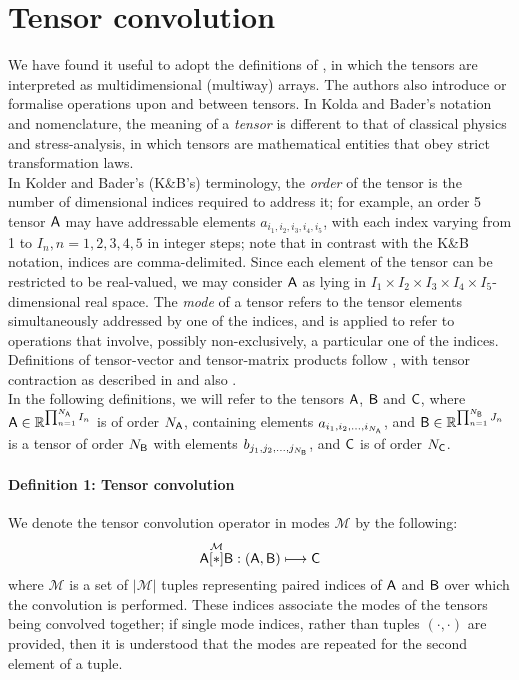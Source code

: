 \section{Tensor convolution}
\label{sec:AppTensorConv}
We have found it useful to adopt the definitions of \citep{kolda2009tensor}, in which the tensors are interpreted as multidimensional (multiway) arrays. The authors also introduce or formalise  operations upon and between tensors.  In Kolda and Bader's notation and nomenclature, the meaning of a {\em tensor} is different to that of classical physics and stress-analysis, in which tensors are mathematical entities that obey strict transformation laws.\\

In Kolder and Bader's (K\&B's) terminology, the {\it order} of the tensor is the number of dimensional indices required to address it; for example, an order 5 tensor $\mathsf{A}$ may have addressable elements $a_{i_1,i_2,i_3,i_4,i_5}$, with each index varying from 1 to $I_n, n = 1,2,3,4,5$ in integer steps; note that in contrast with the K\&B notation, indices are comma-delimited.  Since each element of the tensor can be restricted to be real-valued, we may consider $\mathsf{A}$ as lying in $I_1\times I_2\times I_3 \times I_4 \times I_5$- dimensional real space. The {\it mode} of a tensor refers to the tensor elements simultaneously addressed by one of the indices, and is applied to refer to operations that involve, possibly non-exclusively, a particular one of the indices.  Definitions of tensor-vector and tensor-matrix products follow \cite{kolda2009tensor}, with tensor contraction as described in \citep{bader2006algorithm} and also \citep{aja2009tensors}.\\

In the following definitions, we will refer to the tensors $\mathsf{A}$, $\mathsf{B}$ and $\mathsf{C}$, where $\mathsf{A}\in\mathbb{R}^{\prod_{n=1}^{N_{\mathsf{A}}}I_n}$ is of order $N_{\mathsf{A}}$, containing elements $a_{i_1,i_2,...,i_{N_{\mathsf{A}}}}$, and $\mathsf{B}\in\mathbb{R}^{\prod_{n=1}^{N_{\mathsf{B}}}J_n}$ is a tensor of order $N_{\mathsf{B}}$ with elements $b_{j_1,j_2,...,j_{N_{\mathsf{B}}}}$, and $\mathsf{C}$ is of order $N_{\mathsf{C}}$.

\paragraph{Definition 1: Tensor convolution} We denote the tensor convolution operator in modes $\mathcal{M}$ by the following:
\[
\mathsf{A} \overset{\mathcal{M}}{[ \ast ]} \mathsf{B}: \left (\mathsf{A},\mathsf{B}  \right ) \longmapsto \mathsf{C}
\] 
 where $\mathcal{M}$ is a set of $|\mathcal{M}|$ tuples representing paired indices of $\mathsf{A}$ and $\mathsf{B}$ over which the convolution is performed.   These indices associate the modes of the tensors being convolved together; if single mode indices, rather than tuples $(\cdot,\cdot)$ are provided, then it is understood that the modes are repeated for the second element of a tuple.\\

